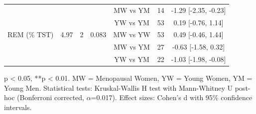 \documentclass[ASNA,twocolumn]{USG}
\begin{document}
\begin{table}[!ht]
\begin{tabular*}{\textwidth}{@{\extracolsep\fill}lcccccc@{\extracolsep\fill}}
 & & & & MW vs YM & 14 & -1.29 [-2.35, -0.23] \\
 & & & & YW vs YM & 53 & 0.19 [-0.76, 1.14] \\
\midrule
REM (\% TST) & 4.97 & 2 & 0.083 & MW vs YW & 53 & 0.49 [-0.46, 1.44] \\
 & & & & MW vs YM & 27 & -0.63 [-1.58, 0.32] \\
 & & & & YW vs YM & 22 & -1.03 [-1.98, -0.08] \\
\bottomrule
\end{tabular*}
\begin{tablenotes}
\item *p < 0.05, **p < 0.01. MW = Menopausal Women, YW = Young Women, YM = Young Men. Statistical tests: Kruskal-Wallis H test with Mann-Whitney U post-hoc (Bonferroni corrected, $\alpha$=0.017). Effect sizes: Cohen's d with 95\% confidence intervals.
\end{tablenotes}
\label{tab:supp_stats}
\end{table}
\end{document}
